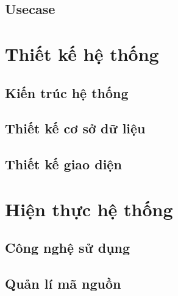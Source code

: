 \documentclass[a4paper,12pt,fleqn,print,oneside]{extarticle}
\begin{document}
\subsection{Usecase}






\newpage
\section{Thiết kế hệ thống}

\subsection{Kiến trúc hệ thống}


\newpage
\subsection{Thiết kế cơ sở dữ liệu}




\subsection{Thiết kế giao diện}


% 

\newpage
\section{Hiện thực hệ thống}
\subsection{Công nghệ sử dụng}


\subsection{Quản lí mã nguồn}

\end{document}
